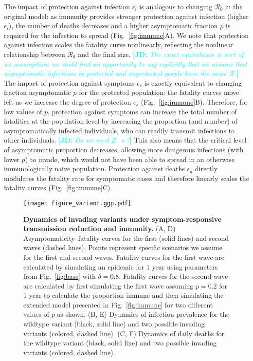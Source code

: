 \documentclass[12pt]{article}
\newcommand{\comment}{\showcomment}
\newcommand{\showcomment}[3]{\textcolor{#1}{\textbf{[#2: }\textsl{#3}\textbf{]}}}
\newcommand{\jd}[1]{\comment{cyan}{JD}{#1}}
\newcommand{\fref}[1]{Fig.~\ref{fig:#1}}
\newcommand{\RR}{\ensuremath{{\mathcal R}}\xspace}
\begin{document}
The impact of protection against infection $\epsilon_i$ is analogous to changing $\RR_0$ in the original model: as immunity provides stronger protection against infection (higher $\epsilon_i$), the number of deaths decreases and a higher asymptomatic fraction $p$ is required for the infection to spread (\fref{immune}A).
We note that protection against infection scales the fatality curve nonlinearly, reflecting the nonlinear relationship between $\RR_0$ and the final size.
\jd{The exact equivalance is sort of an assumption: we shold find an opportunity to say explicitly that we assume that asymptomatic infections in protected and unprotected people have the same \RR.}
The impact of protection against symptoms $\epsilon_s$ is exactly equivalent to changing fraction asymptomatic $p$ for the protected population:
the fatality curves move left as we increase the degree of protection $\epsilon_s$ (\fref{immune}B).
Therefore, for low values of $p$, protection against symptoms can increase the total number of fatalities at the population level by increasing the proportion (and number) of asymptomatically infected individuals, who can readily transmit infections to other individuals.
\jd{Do we need ff.~s.?} This also means that the critical level of asymptomatic proportion decreases, allowing more dangerous infections (with lower $p$) to invade, which would not have been able to spread in an otherwise immunologically naive population.
Protection against deaths $\epsilon_d$ directly modulates the fatality rate for symptomatic cases and therefore linearly scales the fatality curves (\fref{immune}C).

\begin{figure}[!ht]
\texttt{[image: figure\_variant.ggp.pdf]}
\caption{
\textbf{Dynamics of invading variants under symptom-responsive transmission reduction and immunity.}
(A, D) Asymptomaticity--fatality curves for the first (solid lines) and second waves (dashed lines).
Points represent specific scenarios we assume for the first and second waves.
Fatality curves for the first wave are calculated by simulating an epidemic for 1 year using parameters from \fref{base} with $\delta=0.8$.
Fatality curves for the second wave are calculated by first simulating the first wave assuming $p=0.2$ for 1 year to calculate the proportion immune and then simulating the extended model presented in \fref{immune} for two different values of $p$ as shown.
(B, E) Dynamics of infection prevalence for the wildtype variant (black, solid line) and two possible invading variants (colored, dashed line).
(C, F) Dynamics of daily deaths for the wildtype variant (black, solid line) and two possible invading variants (colored, dashed line).
}
\label{fig:variant}
\end{figure}
\end{document}
